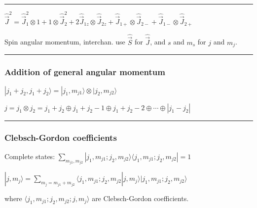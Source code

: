 \hrule height 0.05pt

$\widehat{\vec{J}}^2 = \widehat{\vec{J}}^2_1 \otimes 1 + 1 \otimes \widehat{\vec{J}}_2^2 + 2 \widehat{\vec{J}}_{1z} \otimes \widehat{\vec{J}}_{2z} + \widehat{\vec{J}}_{1+} \otimes \widehat{\vec{J}}_{2-} + \widehat{\vec{J}}_{1-} \otimes \widehat{\vec{J}}_{2+}$

Spin angular momentum, interchan. use $\widehat{\vec{S}}$ for $\widehat{\vec{J}}$, and $s$ and $m_s$ for $j$ and $m_j$.

\hrule height 0.05pt

\subsubsection{Addition of general angular momentum}

$|j_1 + j_2, j_1 + j_2 \rangle = | j_1, m_{j1} \rangle \otimes |j_2, m_{j2} \rangle$

$j = j_1 \otimes j_2 = j_1 + j_2 \oplus j_1 + j_2 - 1 \oplus j_1 + j_2 - 2 \oplus \cdots \oplus |j_1 - j_2|$

\hrule height 0.05pt

\subsubsection{Clebsch-Gordon coefficients}


\hfill

Complete states: $\sum_{m_{j1}, m_{j2}} |j_1, m_{j1}; j_2, m_{j2} \rangle \langle j_1, m_{j1}; j_2, m_{j2}| = 1$

$|j, m_j \rangle = \sum_{m_j = m_{j1} + m_{j2}} \langle j_1, m_{j1}; j_2, m_{j2} | j, m_j \rangle | j_1, m_{j1}; j_2, m_{j2} \rangle$

where $\langle j_1, m_{j1}; j_2, m_{j2}; j, m_j \rangle$ are Clebsch-Gordon coefficients.

